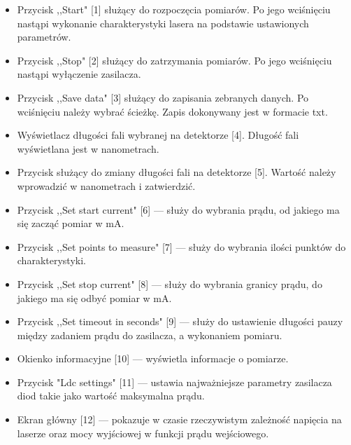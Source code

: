 \begin{itemize}
\item Przycisk ,,Start" [1] służący do rozpoczęcia pomiarów. Po jego wciśnięciu nastąpi wykonanie charakterystyki lasera na podstawie ustawionych parametrów.
\item Przycisk ,,Stop" [2] służący do zatrzymania pomiarów. Po jego wciśnięciu nastąpi wyłączenie zasilacza.
\item Przycisk ,,Save data" [3] służący do zapisania zebranych danych. Po wciśnięciu należy wybrać ścieżkę. Zapis dokonywany jest w formacie txt.
\item Wyświetlacz długości fali wybranej na detektorze [4]. Długość fali wyświetlana jest w nanometrach.
\item Przycisk służący do zmiany długości fali na detektorze [5]. Wartość należy wprowadzić w nanometrach i zatwierdzić.
\item Przycisk ,,Set start current" [6] --- służy do wybrania prądu, od jakiego ma się zacząć pomiar w mA.
\item Przycisk ,,Set points to measure" [7] --- służy do wybrania ilości punktów do charakterystyki.
\item Przycisk ,,Set stop current" [8] --- służy do wybrania granicy prądu, do jakiego ma się odbyć pomiar w mA.
\item Przycisk ,,Set timeout in seconds" [9] --- służy do ustawienie długości pauzy między zadaniem prądu do zasilacza, a wykonaniem pomiaru.
\item Okienko informacyjne [10] --- wyświetla informacje o pomiarze.
\item Przycisk "Ldc settings" [11] --- ustawia najważniejsze parametry zasilacza diod takie jako wartość maksymalna prądu.
\item Ekran główny [12] --- pokazuje w czasie rzeczywistym zależność napięcia na laserze oraz mocy wyjściowej w funkcji
prądu wejściowego.
\end{itemize}